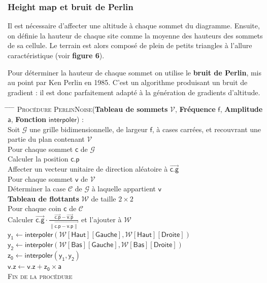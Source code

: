\documentclass[a4paper, 10pt]{article}
\begin{document}
\subsubsection{Height map et bruit de Perlin}  
Il est nécessaire d'affecter une altitude à chaque sommet du diagramme. Ensuite, on définie la hauteur de chaque site comme la moyenne des hauteurs des sommets de sa cellule. Le terrain est alors composé de plein de petits triangles à l'allure caractéristique (voir \textbf{figure 6}).  
  
Pour déterminer la hauteur de chaque sommet on utilise le \textbf{bruit de Perlin}, mis au point par Ken Perlin en 1985. C'est un algorithme produisant un bruit de gradient : il est donc parfaitement adapté à la génération de gradients d'altitude.  
\newpage
\begin{tabbing}
\hspace{0.5cm} \= \hspace{0.5cm} \= \hspace{0.5cm} \= \hspace{0.5cm} \= \kill
\textsc{Procédure PerlinNoise}(\textbf{Tableau de sommets} $\mathcal{V}$, \textbf{Fréquence} $\mathsf{f}$, \textbf{Amplitude} $\mathsf{a}$, \textbf{Fonction} $\mathsf{interpoler}$) : \\
\> Soit $\mathcal{G}$ une grille bidimensionnelle, de largeur $\mathsf{f}$, à cases carrées, et recouvrant une partie du plan contenant $\mathcal{V}$ \\
\> Pour chaque sommet $\mathsf{c}$ de $\mathcal{G}$ \\
\> \> Calculer la position $\mathsf{c.p}$ \\
\> \> Affecter un vecteur unitaire de direction aléatoire à $\overrightarrow{\mathsf{c.g}}$ \\
\> Pour chaque sommet $\mathsf{v}$ de $\mathcal{V}$ \\
\> \> Déterminer la case $\mathcal{C}$ de $\mathcal{G}$ à laquelle appartient $\mathsf{v}$ \\
\> \> \textbf{Tableau de flottants} $\mathcal{W}$ de taille $2\times 2$ \\
\> \> Pour chaque coin $\mathsf{c}$ de $\mathcal{C}$ \\
\> \> \> Calculer $\overrightarrow{\mathsf{c.g}}\cdot \frac{\overrightarrow{\mathsf{c.p}}-\overrightarrow{\mathsf{v.p}}}{\|\overrightarrow{\mathsf{c.p - v.p}\|}}$ et l'ajouter à $\mathcal{W}$ \\
\> \> $\mathsf{y_1} \longleftarrow \mathsf{interpoler}(\mathcal{W}\mathsf{[Haut][Gauche]}, \mathcal{W}\mathsf{[Haut][Droite]})$ \\
\> \> $\mathsf{y_2} \longleftarrow \mathsf{interpoler}(\mathcal{W}\mathsf{[Bas][Gauche]}, \mathcal{W}\mathsf{[Bas][Droite]})$ \\
\> \> $\mathsf{z_0} \longleftarrow \mathsf{interpoler}(\mathsf{y_1}, \mathsf{y_2})$ \\
\> \> $\mathsf{v.z \longleftarrow v.z+\mathsf{z_0\times a}}$ \\
\textsc{Fin de la procédure}
\end{tabbing}
\end{document}

